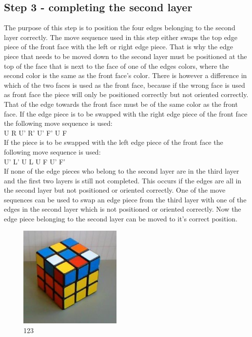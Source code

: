 \subsection{Step 3 - completing the second layer}
The purpose of this step is to position the four edges belonging to the second layer correctly. The move sequence used in this step either swaps the top edge piece of the front face with the left or right edge piece. That is why the edge piece that needs to be moved down to the second layer must be positioned at the top of the face that is next to the face of one of the edges colors, where the second color is the same as the front face's color. There is however a difference in which of the two faces is used as the front face, because if the wrong face is used as front face the piece will only be positioned correctly but not oriented correctly. That \facelet{} of the edge towards the front face must be of the same color as the front face. If the edge piece is to be swapped with the right edge piece of the front face the following move sequence is used: \\

U R U' R' U' F' U F \\

If the piece is to be swapped with the left edge piece of the front face the following move sequence is used: \\

U' L' U L U F U' F' \\

If none of the edge pieces who belong to the second layer are in the third layer and the first two layers is still not completed. This occurs if the edges are all in the second layer but not positioned or oriented correctly. One of the move sequences can be used to swap an edge piece from the third layer with one of the edges in the second layer which is not positioned or oriented correctly. Now the edge piece belonging to the second layer can be moved to it's correct position.

\begin{figure}
\begin{center}
	\includegraphics[width=0.45\textwidth]{input/pics/3F2L.jpg}	
\end{center}
\caption{123}
\label{fig:3F2L}
\end{figure}

